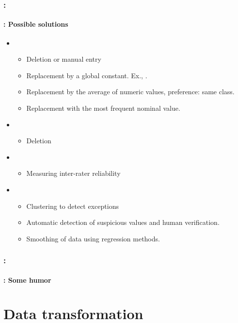 \documentclass[xcolor=table]{beamer}
\begin{document}
\begin{frame}
	\frametitle{\insertshortsubtitle: \insertsection}
	\framesubtitle{\insertsubsection: Possible solutions}
	
	\begin{itemize}
		\item {}
		\begin{itemize}
			\item Deletion or manual entry
			\item Replacement by a global constant. Ex., .
			\item Replacement by the average of numeric values, preference: same class.
			\item Replacement with the most frequent nominal value.
		\end{itemize}
		\item {}
		\begin{itemize}
			\item Deletion
		\end{itemize}
		\item {}
		\begin{itemize}
			\item Measuring inter-rater reliability
		\end{itemize}
		\item {}
		\begin{itemize}
			\item Clustering to detect exceptions
			\item Automatic detection of suspicious values and human verification.
			\item Smoothing of data using regression methods.
		\end{itemize}
	\end{itemize}
	
\end{frame}

\begin{frame}
	\frametitle{\insertshortsubtitle: \insertsection}
	\framesubtitle{\insertsubsection: Some humor}
	
	\begin{center}
	\end{center}
	
\end{frame}

\section{Data transformation}
\end{document}

